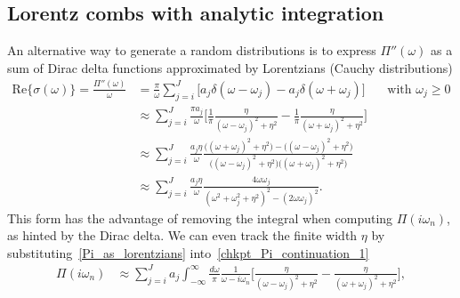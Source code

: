 \documentclass[notitlepage, 11pt, nofootinbib]{revtex4-1}
\begin{document}
\subsection{Lorentz combs with analytic integration}
An alternative way to generate a random distributions is to express $\Pi''(\omega)$ as a sum of Dirac delta functions approximated by Lorentzians (Cauchy distributions)
\begin{align}
\text{Re}\{ \sigma(\omega) \} = \frac{\Pi''(\omega)}{\omega}
&=
\frac{\pi}{\omega}
\sum_{j=i}^{J}
\Big[
a_j\delta(\omega-\omega_j)
-a_j\delta(\omega+\omega_j)
\Big]
&&\text{with }\omega_j\geq0
\label{Pi_as_delta}
\\
&\approx
\sum_{j=i}^{J}
\frac{\pi a_j}{\omega}
\Big[
\frac{1}{\pi}
\frac{\eta}{(\omega-\omega_j)^2+\eta^2}
-
\frac{1}{\pi}
\frac{\eta}{(\omega+\omega_j)^2+\eta^2}
\Big]
\label{Pi_as_lorentzians}
\\
&\approx
\sum_{j=i}^{J}
\frac{a_j\eta}{\omega}
\frac{
\big((\omega+\omega_j)^2+\eta^2\big) 
-\big((\omega-\omega_j)^2+\eta^2\big)
}{
\big((\omega-\omega_j)^2+\eta^2\big)
\big((\omega+\omega_j)^2+\eta^2\big)
}
\\
&\approx
\sum_{j=i}^{J}
\frac{a_j\eta}{\omega}
\frac{
4\omega\omega_j
}{
(\omega^2+\omega_j^2+\eta^2)^2 - (2\omega\omega_j)^2
}.
\label{sigma_lorentz}
\end{align}
This form has the advantage of removing the integral when computing $\Pi(i\omega_n)$, as hinted by the Dirac delta.
We can even track the finite width $\eta$ by substituting~\eqref{Pi_as_lorentzians} into~\eqref{chkpt_Pi_continuation_1}
\begin{align}
\Pi(i\omega_n)
&\approx
\sum_{j=i}^{J}
a_j
\int_{-\infty}^{\infty} \frac{d\omega}{\pi}
\frac{1}{\omega-i\omega_n}
\Big[
\frac{\eta}{(\omega-\omega_j)^2+\eta^2}
-
\frac{\eta}{(\omega+\omega_j)^2+\eta^2}
\Big],
\label{Pi_with_eta}
\end{align}
\end{document}
